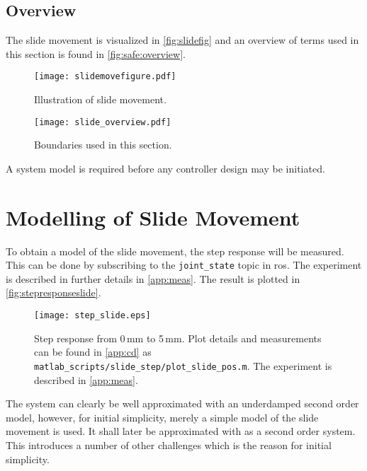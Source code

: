 \subsection{Overview}
The slide movement is visualized in \autoref{fig:slidefig} and an overview of terms used in this section is found in \autoref{fig:safe:overview}.
\begin{figure}[H]
    \centering
    \begin{minipage}{.5\textwidth}
        \centering
        \texttt{[image: slidemovefigure.pdf]}
        \caption{Illustration of slide movement.}
        \label{fig:slidefig}
    \end{minipage}%
    \begin{minipage}{0.5\textwidth}
        \centering
        \texttt{[image: slide\_overview.pdf]}
        \caption{Boundaries used in this section.}
        \label{fig:safe:overview}
    \end{minipage}
\end{figure}
A system model is required before any controller design may be initiated.
\section{Modelling of Slide Movement}
To obtain a model of the slide movement, the step response will be measured.  This can be done by subscribing to the \texttt{joint\_state} topic in \gls{ros}. The experiment is described in further details in \autoref{app:meas}. The result is plotted in \autoref{fig:stepresponseslide}. 
\begin{figure}[H]
\center
\texttt{[image: step\_slide.eps]}
\caption{Step response from 0\,mm to 5\,mm. Plot details and measurements can be found in \autoref{app:cd} as \texttt{matlab\_scripts/slide\_step/plot\_slide\_pos.m}. The experiment is described in \autoref{app:meas}.}
\label{fig:stepresponseslide}
\end{figure}
The system can clearly be well approximated with an underdamped second order model, however, for initial simplicity, merely a simple model of the slide movement is used. It shall later be approximated with as a second order system. This introduces a number of other challenges which is the reason for initial simplicity.

